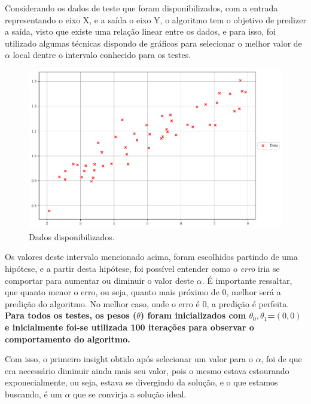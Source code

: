 \documentclass[a4paper, 12pt]{article}
\begin{document}
Considerando os dados de teste que foram disponibilizados, com a entrada representando o eixo X, 
e a saída o eixo Y, o algoritmo tem o objetivo de predizer a saída, visto que existe uma 
relação linear entre os dados, e para isso, foi utilizado algumas técnicas dispondo de gráficos para 
selecionar o melhor valor de $\alpha$ local dentre o intervalo conhecido para os testes.

\begin{figure}[!h]
    \centering
    \includegraphics[width=1\textwidth]{../imgs/data.pdf}
    \caption{Dados disponibilizados.}
    \label{fig:data}
\end{figure}
\clearpage

Os valores deste intervalo mencionado acima, foram escolhidos partindo de uma hipótese, 
e a partir desta hipótese, foi possível entender como o \textit{erro} iria se comportar para
aumentar ou diminuir o valor deste $\alpha$. É importante ressaltar, que quanto menor o erro, ou seja,
quanto mais próximo de $0$, melhor será a predição do algoritmo. No melhor caso, onde o erro é $0$, a
predição é perfeita.\\

\textbf{Para todos os testes, os pesos ($\theta$) foram inicializados com $\theta_0, \theta_1$=$(0,0)$ e inicialmente foi-se 
utilizada 100 iterações para observar o comportamento do algoritmo.\\}

Com isso, o primeiro insight obtido após selecionar um valor para o $\alpha$, foi de que era necessário diminuir
ainda mais seu valor, pois o mesmo estava estourando exponecialmente, ou seja, estava se divergindo da solução,
e o que estamos buscando, é um $\alpha$ que se convirja a solução ideal.
\end{document}
